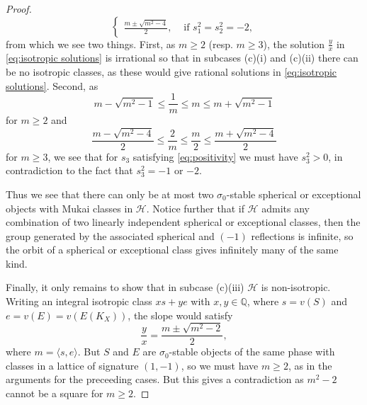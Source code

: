 \documentclass[leqno,11pt]{amsart}
\def\Q{\ensuremath{\mathbb{Q}}}
\theoremstyle{definition}
\def\Q{\ensuremath{\mathbb{Q}}}
\def\HH{\ensuremath{\mathcal H}}
\begin{document}
\begin{proof}
\begin{equation}
\begin{cases}
\frac{m\pm\sqrt{m^2-4}}{2}, & \text{ if }s_1^2=s_2^2=-2,
\end{cases}\end{equation} from which we see two things.  First, as $m\geq 2$ (resp. $m\geq 3$), the solution $\frac{y}{x}$ in \eqref{eq:isotropic solutions} is irrational so that in subcases (c)(i) and (c)(ii) there can be no isotropic classes, as these would give rational solutions in \eqref{eq:isotropic solutions}.  Second, as $$m-\sqrt{m^2-1}\leq\frac{1}{m}\leq m\leq m+\sqrt{m^2-1}$$ for $m\geq 2$ and $$\frac{m-\sqrt{m^2-4}}{2}\leq\frac{2}{m}\leq\frac{m}{2}\leq\frac{m+\sqrt{m^2-4}}{2}$$ for $m\geq 3$, we see that for $s_3$ satisfying \eqref{eq:positivity} we must have $s_3^2>0$, in contradiction to the fact that $s_3^2=-1$ or $-2$.  

Thus we see that there can only be at most two $\sigma_0$-stable spherical or exceptional objects with Mukai classes in $\HH$.  Notice further that if $\HH$ admits any combination of two linearly independent spherical or exceptional classes, then the group generated by the associated spherical and $(-1)$ reflections is infinite, so the orbit of a spherical or exceptional class gives infinitely many of the same kind. 

Finally, it only remains to show that in subcase (c)(iii) $\HH$ is non-isotropic.  Writing an integral isotropic class $xs+ye$ with $x,y\in\Q$, where $s=v(S)$ and $e=v(E)=v(E(K_X))$, the slope would satisfy $$\frac{y}{x}=\frac{m\pm\sqrt{m^2-2}}{2},$$ where $m=\langle s,e\rangle$.  But $S$ and $E$ are $\sigma_0$-stable objects of the same phase with classes in a lattice of signature $(1,-1)$, so we must have $m\geq 2$, as in the arguments for the preceeding cases.  But this gives a contradiction as $m^2-2$ cannot be a square for $m\geq 2$.
\end{proof}
\end{document}
